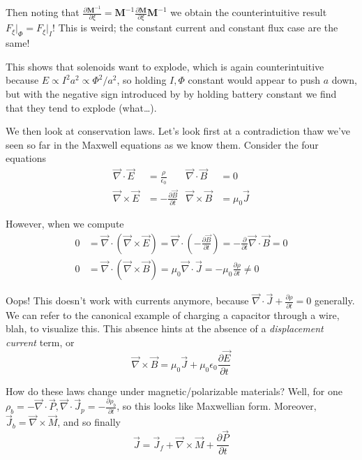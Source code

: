 \documentclass[10pt]{report}
\newcommand{\pd}[2]{\frac{\partial #1}{\partial#2}}
\begin{document}
Then noting that $\pd{\mathbf{M}^{-1}}{\xi} = \mathbf{M}^{-1}\pd{\mathbf{M}}{\xi}\mathbf{M}^{-1}$ we obtain the counterintuitive result $F_{\xi}\Big|_\Phi = F_\xi\Big|_I$! This is weird; the constant current and constant flux case are the same!

This shows that solenoids want to explode, which is again counterintuitive because $E \propto I^2a^2 \propto \Phi^2/a^2$, so holding $I,\Phi$ constant would appear to push $a$ down, but with the negative sign introduced by by holding battery constant we find that they tend to explode (what\dots).

We then look at conservation laws. Let's look first at a contradiction thaw we've seen so far in the Maxwell equations as we know them. Consider the four equations
\begin{align}
    \vec{\nabla} \cdot \vec{E} &= \frac{\rho}{\epsilon_0} & \vec{\nabla} \cdot \vec{B} &= 0\\
    \vec{\nabla} \times \vec{E} &= -\pd{\vec{B}}{t} & \vec{\nabla} \times \vec{B} &= \mu_0\vec{J}
\end{align}

However, when we compute
\begin{align}
    0 &= \vec{\nabla} \cdot \left( \vec{\nabla} \times \vec{E} \right) = \vec{\nabla} \cdot \left( -\pd{\vec{B}}{t} \right) = -\pd{}{t}\vec{\nabla} \cdot \vec{B} = 0\\
    0 &= \vec{\nabla} \cdot \left( \vec{\nabla} \times \vec{B} \right) = \mu_0 \vec{\nabla} \cdot \vec{J} = -\mu_0 \pd{\rho}{t} \neq 0
\end{align}

Oops! This doesn't work with currents anymore, because $\vec{\nabla} \cdot \vec{J} + \pd{\rho}{t} = 0$ generally. We can refer to the canonical example of charging a capacitor through a wire, blah, to visualize this. This absence hints at the absence of a \emph{displacement current} term, or
\begin{equation}
    \vec{\nabla} \times \vec{B} = \mu_0 \vec{J} + \mu_0\epsilon_0 \pd{\vec{E}}{t}
\end{equation}

How do these laws change under magnetic/polarizable materials? Well, for one $\rho_b = -\vec{\nabla} \cdot \vec{P}, \vec{\nabla} \cdot \vec{J}_p = -\pd{\rho_b}{t}$, so this looks like Maxwellian form. Moreover, $\vec{J}_b = \vec{\nabla} \times \vec{M}$, and so finally
\begin{equation}
    \vec{J} = \vec{J}_f + \vec{\nabla} \times \vec{M} + \pd{\vec{P}}{t}
\end{equation}
\end{document}
